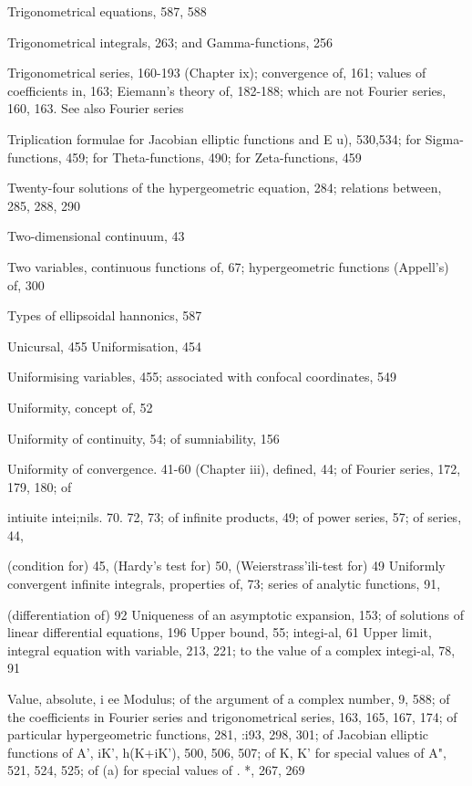 Trigonometrical equations, 587, 588

Trigonometrical integrals, 263; and Gamma-functions, 256

Trigonometrical series, 160-193 (Chapter ix); convergence of, 161; values of coefficients in, 163;
Eiemann's theory of, 182-188; which are not Fourier series, 160, 163. See also Fourier series

Triplication formulae for Jacobian elliptic functions and E  u), 530,534; for Sigma-functions,
459; for Theta-functions, 490; for Zeta-functions, 459

Twenty-four solutions of the hypergeometric equation, 284; relations between, 285, 288, 290

Two-dimensional continuum, 43

Two variables, continuous functions of, 67; hypergeometric functions (Appell's) of, 300

Types of ellipsoidal hannonics, 587

Unicursal, 455
Uniformisation, 454

%
%

Uniformising variables, 455; associated with confocal coordinates, 549

Uniformity, concept of, 52

Uniformity of continuity, 54; of sumniability, 156

Uniformity of convergence. 41-60 (Chapter iii), defined, 44; of Fourier series, 172, 179, 180; of

intiuite intei;nils. 70. 72, 73; of infinite products, 49; of power series, 57; of series, 44,

(condition for) 45, (Hardy's test for) 50, (Weierstrass'ili-test for) 49
Uniformly convergent infinite integrals, properties of, 73; series of analytic functions, 91,

(differentiation of) 92
Uniqueness of an asymptotic expansion, 153; of solutions of linear differential equations, 196
Upper bound, 55; integi-al, 61
Upper limit, integral equation with variable, 213, 221; to the value of a complex integi-al, 78, 91

Value, absolute, i ee Modulus; of the argument of a complex number, 9, 588; of the coefficients
in Fourier series and trigonometrical series, 163, 165, 167, 174; of particular hypergeometric
functions, 281, :i93, 298, 301; of Jacobian elliptic functions of  A',  iK', h(K+iK'), 500,
506, 507; of K, K' for special values of A", 521, 524, 525; of  (a) for special values of . *,
267, 269

